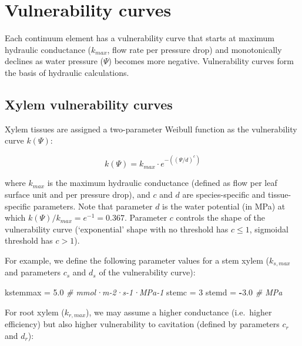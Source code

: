 \documentclass[]{book}
\newenvironment{Shaded}{\begin{snugshade}}{\end{snugshade}}
\newcommand{\DecValTok}[1]{\textcolor[rgb]{0.00,0.00,0.81}{#1}}
\newcommand{\FloatTok}[1]{\textcolor[rgb]{0.00,0.00,0.81}{#1}}
\newcommand{\StringTok}[1]{\textcolor[rgb]{0.31,0.60,0.02}{#1}}
\newcommand{\CommentTok}[1]{\textcolor[rgb]{0.56,0.35,0.01}{\textit{#1}}}
\newcommand{\OperatorTok}[1]{\textcolor[rgb]{0.81,0.36,0.00}{\textbf{#1}}}
\newcommand{\NormalTok}[1]{#1}
\begin{document}
\section{Vulnerability curves}\label{vulnerability-curves}

Each continuum element has a vulnerability curve that starts at maximum
hydraulic conductance (\(k_{max}\), flow rate per pressure drop) and
monotonically declines as water pressure (\(\Psi\)) becomes more
negative. Vulnerability curves form the basis of hydraulic calculations.

\subsection{Xylem vulnerability
curves}\label{xylem-vulnerability-curves}

Xylem tissues are assigned a two-parameter Weibull function as the
vulnerability curve \(k(\Psi)\):

\begin{equation}
k(\Psi) = k_{max}\cdot e^{-((\Psi/d)^c)}
\label{eq:xylemvulnerability}
\end{equation}

where \(k_{max}\) is the maximum hydraulic conductance (defined as flow
per leaf surface unit and per pressure drop), and \(c\) and \(d\) are
species-specific and tissue-specific parameters. Note that parameter
\(d\) is the water potential (in MPa) at which
\(k(\Psi)/k_{max} = e^{-1} = 0.367\). Parameter \(c\) controls the shape
of the vulnerability curve (`exponential' shape with no threshold has
\(c \leq 1\), sigmoidal threshold has \(c > 1\)).

For example, we define the following parameter values for a stem xylem
(\(k_{s,max}\) and parameters \(c_s\) and \(d_s\) of the vulnerability
curve):

\begin{Shaded}
\begin{Highlighting}[]
\NormalTok{kstemmax =}\StringTok{ }\FloatTok{5.0} \CommentTok{# mmol·m-2·s-1·MPa-1}
\NormalTok{stemc =}\StringTok{ }\DecValTok{3} 
\NormalTok{stemd =}\StringTok{ }\OperatorTok{-}\FloatTok{3.0} \CommentTok{# MPa}
\end{Highlighting}
\end{Shaded}

For root xylem (\(k_{r,max}\)), we may assume a higher conductance
(i.e.~higher efficiency) but also higher vulnerability to cavitation
(defined by parameters \(c_r\) and \(d_r\)):
\end{document}
